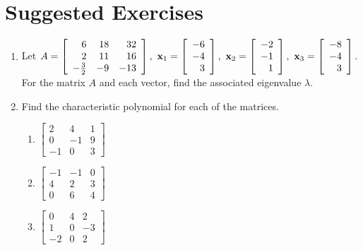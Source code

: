 \section{Suggested Exercises}\label{ssec.sse7}

\begin{enumerate}
\item Let $A=\left [ \begin{array}{rrr}
                        6&18&32\\
                        2&11&16\\
                        -\frac{3}{2}&-9&-13\end{array} \right ],
                        \
                        {\bf x}_1=\left [ \begin{array}{r} -6\\-4\\3\end{array} \right ],
                        \
                        {\bf x}_2=\left [ \begin{array}{r} -2\\-1\\1 \end{array} \right ],
                        \
                        {\bf x}_3=\left [ \begin{array}{r} -8\\-4\\3 \end{array} \right
                        ].$
For the matrix $A$ and each vector, find the associated eigenvalue
$\lambda$.
\item Find the characteristic polynomial for each of the matrices.
\begin{enumerate}
\item $\left [ \begin{array}{rrr} 2&4&1\\0&-1&9\\-1&0&3 \end{array} \right ]$
\item $\left [ \begin{array}{rrr}
                -1&-1&0\\4&2&3\\0&6&4\end{array} \right ]$
\item $\left [ \begin{array}{rrr}
                0&4&2\\1&0&-3\\-2&0&2\end{array} \right ]$

\end{enumerate}
\end{enumerate}
